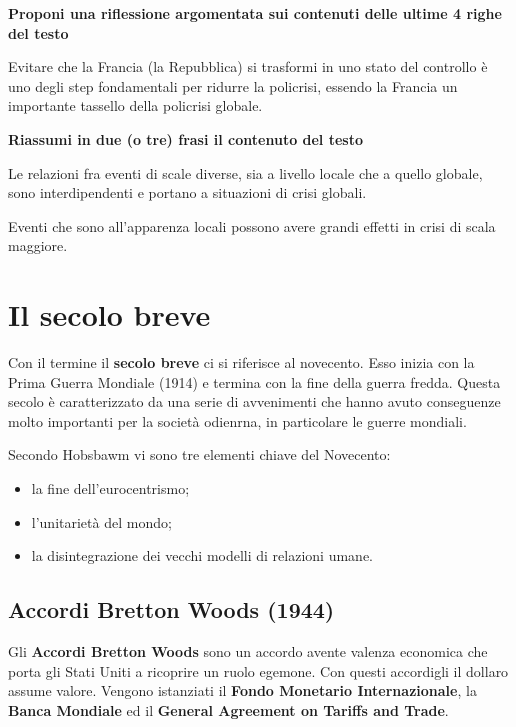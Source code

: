 \documentclass[a4paper]{article}
\begin{document}
\textbf{Proponi una riflessione argomentata sui contenuti delle ultime 4 righe del testo}

Evitare che la Francia (la Repubblica) si trasformi in uno stato del controllo
è uno degli step fondamentali per ridurre la policrisi,
essendo la Francia un importante tassello della policrisi globale.

\textbf{Riassumi in due (o tre) frasi il contenuto del testo}

Le relazioni fra eventi di scale diverse, sia a livello locale che a quello globale, 
sono interdipendenti e portano a situazioni di crisi globali.

Eventi che sono all'apparenza locali possono avere grandi effetti in crisi di scala maggiore.

\pagebreak

\section{Il secolo breve}


Con il termine il \textbf{secolo breve} ci si riferisce al novecento.
Esso inizia con la Prima Guerra Mondiale (1914) e termina con la fine della guerra fredda.
Questa secolo è caratterizzato da una serie di avvenimenti che hanno avuto conseguenze molto importanti
per la società odienrna, in particolare le guerre mondiali.

Secondo Hobsbawm vi sono tre elementi chiave del Novecento:
\begin{itemize}
    \item la fine dell'eurocentrismo;
    \item l'unitarietà del mondo;
    \item la disintegrazione dei vecchi modelli di relazioni umane.
\end{itemize}

\subsection{Accordi Bretton Woods (1944)}

Gli \textbf{Accordi Bretton Woods} sono un accordo avente valenza economica
che porta gli Stati Uniti a ricoprire un ruolo egemone. Con questi accordigli il
dollaro assume valore. Vengono istanziati il \textbf{Fondo Monetario Internazionale},
la \textbf{Banca Mondiale} ed il \textbf{General Agreement on Tariffs and Trade}.
\end{document}
